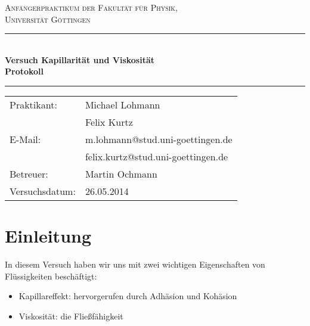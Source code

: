\documentclass[12pt,a4paper,titlepage,headinclude,bibtotoc]{scrartcl}
\begin{document}
\begin{titlepage}
\centering
\textsc{\Large Anfängerpraktikum der Fakultät für
  Physik,\\[1.5ex] Universität Göttingen}

\vspace*{4.2cm}

\rule{\textwidth}{1pt}\\[0.5cm]
{\huge \bfseries
  Versuch Kapillarität und Viskosität\\[1.5ex]
  Protokoll}\\[0.5cm]
\rule{\textwidth}{1pt}

\vspace*{3cm}

\begin{Large}
\begin{tabular}{ll}
Praktikant: &  Michael Lohmann\\
 &  Felix Kurtz\\
 E-Mail: & m.lohmann@stud.uni-goettingen.de\\
 &  felix.kurtz@stud.uni-goettingen.de\\
 Betreuer: & Martin Ochmann\\
 Versuchsdatum: & 26.05.2014\\
\end{tabular}
\end{Large}

\vspace*{0.8cm}

\begin{Large}
\end{Large}

\end{titlepage}

\tableofcontents

\newpage

\section{Einleitung}
\label{sec:einleitung}
In diesem Versuch haben wir uns mit zwei wichtigen Eigenschaften von Flüssigkeiten beschäftigt: 
\begin{itemize}
 \item Kapillareffekt: hervorgerufen durch Adhäsion und Kohäsion
 \item Viskosität: die Fließfähigkeit
\end{itemize}
\end{document}
